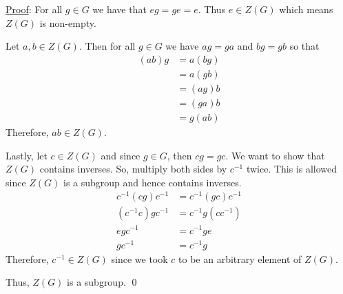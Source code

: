 \documentclass{article}
\begin{document}
\underline{Proof}: For all $g \in G$ we have that $eg = ge = e.$ Thus $e \in Z(G)$ which means $Z(G)$ is non-empty.

Let $a, b \in Z(G).$ Then for all $g \in G$ we have $ag = ga$ and $bg = gb$ so that
\begin{align*}
	(ab)g &= a(bg) \\
	&= a(gb) \\
	&= (ag)b \\
	&= (ga)b \\
	&= g(ab)
\end{align*}
Therefore, $ab \in Z(G).$ 

Lastly, let $c\in Z(G)$ and since $g \in G$, then $cg = gc.$ We want to show that $Z(G)$ contains inverses. So, multiply both sides by $c^{-1}$ twice. This is allowed since $Z(G)$ is a subgroup and hence contains inverses. 
\begin{align*}
	c^{-1} (cg) c^{-1} &= c^{-1} (gc) c^{-1} \\
	(c^{-1} c) gc^{-1} &= c^{-1}g(cc^{-1}) \\
	egc^{-1} &= c^{-1}ge \\
	gc^{-1} &= c^{-1}g
\end{align*}
Therefore, $c^{-1} \in Z(G)$ since we took $c$ to be an arbitrary element of $Z(G).$ 

Thus, $Z(G)$ is a subgroup. \qed \\
\end{document}
